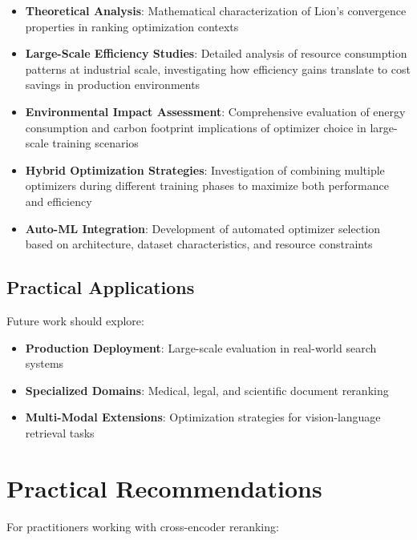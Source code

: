 \begin{itemize}
    \item \textbf{Theoretical Analysis}: Mathematical characterization of Lion's convergence properties in ranking optimization contexts
    
    \item \textbf{Large-Scale Efficiency Studies}: Detailed analysis of resource consumption patterns at industrial scale, investigating how efficiency gains translate to cost savings in production environments
    
    \item \textbf{Environmental Impact Assessment}: Comprehensive evaluation of energy consumption and carbon footprint implications of optimizer choice in large-scale training scenarios
    
    \item \textbf{Hybrid Optimization Strategies}: Investigation of combining multiple optimizers during different training phases to maximize both performance and efficiency
    
    \item \textbf{Auto-ML Integration}: Development of automated optimizer selection based on architecture, dataset characteristics, and resource constraints
\end{itemize}

\subsection{Practical Applications}

Future work should explore:
\begin{itemize}
    \item \textbf{Production Deployment}: Large-scale evaluation in real-world search systems
    \item \textbf{Specialized Domains}: Medical, legal, and scientific document reranking
    \item \textbf{Multi-Modal Extensions}: Optimization strategies for vision-language retrieval tasks
\end{itemize}

\section{Practical Recommendations}

For practitioners working with cross-encoder reranking:

